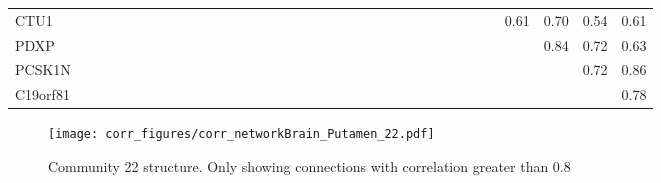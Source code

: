 \begin{longtable}{lrrrrrrrrrrrrrrrrrrrrrrrrrrrrrrrrrr}
CTU1          &            &                    &              &            &               &            &             &              &            &            &               &            &               &               &              &             &             &             &             &                &                &              &               &                     &                  &                &            &               &               &            &       0.61 &         0.70 &           0.54 &          0.61 \\
PDXP          &            &                    &              &            &               &            &             &              &            &            &               &            &               &               &              &             &             &             &             &                &                &              &               &                     &                  &                &            &               &               &            &            &         0.84 &           0.72 &          0.63 \\
PCSK1N        &            &                    &              &            &               &            &             &              &            &            &               &            &               &               &              &             &             &             &             &                &                &              &               &                     &                  &                &            &               &               &            &            &              &           0.72 &          0.86 \\
C19orf81      &            &                    &              &            &               &            &             &              &            &            &               &            &               &               &              &             &             &             &             &                &                &              &               &                     &                  &                &            &               &               &            &            &              &                &          0.78 \\
\end{longtable}


\begin{figure}[h!]
\centering
\texttt{[image: corr\_figures/corr\_networkBrain\_Putamen\_22.pdf]}
\caption{Community 22 structure. Only showing connections with correlation greater than 0.8}
\end{figure}


